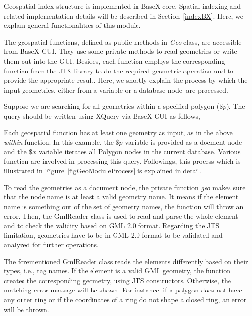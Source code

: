 \documentclass[a4paper,12pt]{article}
\begin{document}
Geospatial index structure is implemented in BaseX core. Spatial indexing and related implementation details will be described in Section~\ref{indexBX}. Here, we explain general functionalities of this module.

The geospatial functions, defined as public methods in \textit{Geo} class, are accessible from BaseX GUI. They use some private methods to read geometries or write them out into the GUI. Besides, each function employs the corresponding function from the JTS library to do the required geometric operation and to provide the appropriate result. Here, we shortly explain the process by which the input geometries, either from a variable or a database node, are processed.


Suppose we are searching for all geometries within a specified polygon ($\$p$). The query should be written using XQuery via BaseX GUI as follows,
\vspace{10px}
\vspace{10px}
Each geospatial function has at least one geometry as input, as in the above \textit{within} function. In this example, the $\$p$ variable is provided as a docment node and the $\$x$ variable iterates all Polygon nodes in the current database. Various function are involved in processing this query. Followings, this process which is illustrated in Figure~\ref{figGeoModuleProcess} is explained in detail. 

To read the geometries as a document node, the private function \textit{geo} makes sure that the node name is at least a valid geometry name. It means if the element name is something out of the set of geometry names, the function will throw an error. 
Then, the GmlReader class is used to read and parse the whole element and to check the validity based on GML 2.0 format. Regarding the JTS limitation, geometries have to be in GML 2.0 format to be validated and analyzed for further operations. 

The forementioned GmlReader class reads the elements differently based on their types, i.e., tag names. If the element is a valid GML geometry, the function creates the corresponding geometry, using JTS constructors. Otherwise, the matching error massage will be shown. For instance, if a polygon does not have any outer ring or if the coordinates of a ring do not shape a closed ring, an error will be thrown. 
\end{document}
